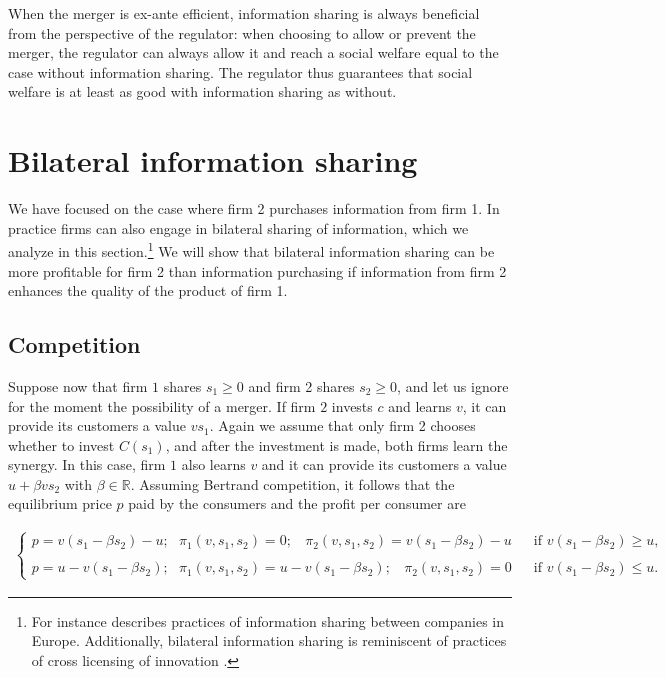 \documentclass[a4paper,leqno]{article}%
\begin{document}
\noindent When the merger is ex-ante efficient, information sharing is always beneficial from the perspective of the regulator: when choosing to allow or prevent the merger, the regulator can always allow it and reach a social welfare equal to the case without information sharing. The regulator thus guarantees that social welfare is at least as good with information sharing as without.


\section{Bilateral information sharing}\label{bilat}

We have focused on the case where firm 2 purchases information from firm 1. In practice firms can also engage in bilateral sharing of information, which we analyze in this section.\footnote{For instance \cite{scaria2018study} describes practices of information sharing between companies in Europe. Additionally, bilateral information sharing is reminiscent of practices of cross licensing of innovation \citep{fershtman1992cross}.} We will show that bilateral information sharing can be more profitable for firm 2 than information purchasing if information from firm 2 enhances the quality of the product of firm 1.


\subsection{Competition}

Suppose now that firm $1$ shares $s_1\geq 0$ and firm 2 shares $s_2\geq0$, and let us ignore for the moment the possibility of a merger. If firm $2$ invests $c$ and learns $v$, it can provide its customers a value $vs_1$. Again we assume that only firm 2 chooses whether to invest $C(s_1)$, and after the investment is made, both firms learn the synergy. In this case, firm $1$ also learns $v$ and it can provide its customers a value $u+\beta v s_2$ with $\beta \in \mathbb{R}$. Assuming Bertrand competition, it follows that the equilibrium price $p$ paid by the consumers and the profit per consumer are

\begin{align}\label{eq1}
\begin{cases}
    p=v (s_1-\beta s_2)-u ;~~~ \pi_1(v,s_1,s_2)=0 ;~~~~ \pi_2(v,s_1,s_2)=v(s_1-\beta s_2)-u &~~ \text{ if }v (s_1-\beta s_2)\geq u,\\
    \\
    p=u-v (s_1-\beta s_2) ;~~~ \pi_1(v,s_1,s_2)=u-v(s_1-\beta s_2);~~~~ \pi_2(v,s_1,s_2)=0 &~~ \text{ if }v (s_1-\beta s_2)\leq u.
\end{cases}
\end{align}
\end{document}
